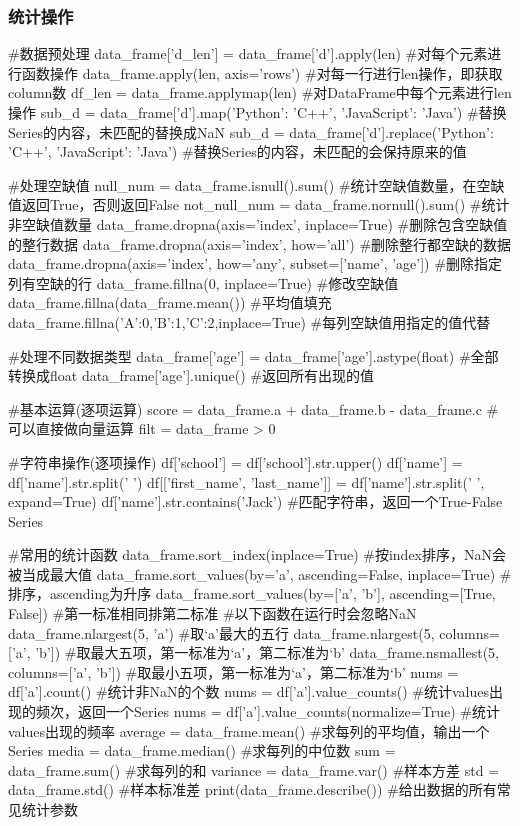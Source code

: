    \subsubsection{统计操作}
      \begin{codeblock}[language=python, caption={Perform statistical operations using DataFrame}]
        #数据预处理
        data_frame['d_len'] = data_frame['d'].apply(len) #对每个元素进行函数操作
        data_frame.apply(len, axis='rows') #对每一行进行len操作，即获取column数
        df_len = data_frame.applymap(len) #对DataFrame中每个元素进行len操作
        sub_d = data_frame['d'].map({'Python': 'C++', 'JavaScript': 'Java'}) 
            #替换Series的内容，未匹配的替换成NaN
        sub_d = data_frame['d'].replace({'Python': 'C++', 'JavaScript': 'Java'}) 
            #替换Series的内容，未匹配的会保持原来的值

        #处理空缺值
        null_num = data_frame.isnull().sum() #统计空缺值数量，在空缺值返回True，否则返回False
        not_null_num = data_frame.nornull().sum() #统计非空缺值数量
        data_frame.dropna(axis='index', inplace=True) #删除包含空缺值的整行数据
        data_frame.dropna(axis='index', how='all') #删除整行都空缺的数据
        data_frame.dropna(axis='index', how='any', subset=['name', 'age']) #删除指定列有空缺的行
        data_frame.fillna(0, inplace=True) #修改空缺值
        data_frame.fillna(data_frame.mean()) #平均值填充
        data_frame.fillna({'A':0,'B':1,'C':2},inplace=True) #每列空缺值用指定的值代替

        #处理不同数据类型
        data_frame['age'] = data_frame['age'].astype(float) #全部转换成float
        data_frame['age'].unique() #返回所有出现的值

        #基本运算(逐项运算)
        score = data_frame.a + data_frame.b - data_frame.c #可以直接做向量运算
        filt = data_frame > 0

        #字符串操作(逐项操作)
        df['school'] = df['school'].str.upper()
        df['name'] = df['name'].str.split(' ') 
        df[['first_name', 'last_name']] = df['name'].str.split(' ', expand=True)
        df['name'].str.contains('Jack') #匹配字符串，返回一个True-False Series

        #常用的统计函数
        data_frame.sort_index(inplace=True) #按index排序，NaN会被当成最大值
        data_frame.sort_values(by='a', ascending=False, inplace=True) #排序，ascending为升序
        data_frame.sort_values(by=['a', 'b'], ascending=[True, False]) #第一标准相同排第二标准
        #以下函数在运行时会忽略NaN
        data_frame.nlargest(5, 'a') #取`a'最大的五行
        data_frame.nlargest(5, columns=['a', 'b']) #取最大五项，第一标准为`a'，第二标准为`b'
        data_frame.nsmallest(5, columns=['a', 'b']) #取最小五项，第一标准为`a'，第二标准为`b'
        nums = df['a'].count() #统计非NaN的个数
        nums = df['a'].value_counts() #统计values出现的频次，返回一个Series
        nums = df['a'].value_counts(normalize=True) #统计values出现的频率
        average = data_frame.mean() #求每列的平均值，输出一个Series
        media = data_frame.median() #求每列的中位数
        sum = data_frame.sum() #求每列的和
        variance = data_frame.var() #样本方差
        std = data_frame.std() #样本标准差
        print(data_frame.describe()) #给出数据的所有常见统计参数


\end{codeblock}
